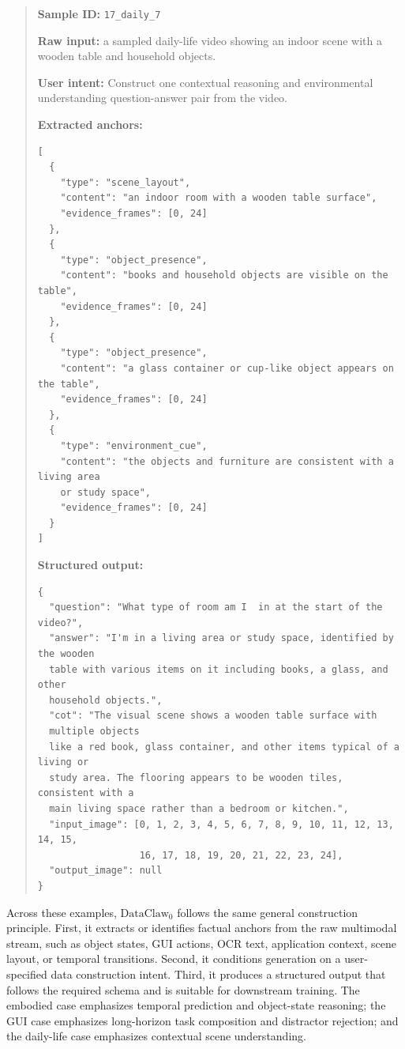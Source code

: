 \documentclass{llmxive}
\begin{document}
\begin{quote}
\small
\textbf{Sample ID:} \texttt{17\_daily\_7}

\textbf{Raw input:} a sampled daily-life video showing an indoor scene with a wooden table and household objects.

\textbf{User intent:} Construct one contextual reasoning and environmental understanding question-answer pair from the video.

\textbf{Extracted anchors:}
\begin{verbatim}
[
  {
    "type": "scene_layout",
    "content": "an indoor room with a wooden table surface",
    "evidence_frames": [0, 24]
  },
  {
    "type": "object_presence",
    "content": "books and household objects are visible on the table",
    "evidence_frames": [0, 24]
  },
  {
    "type": "object_presence",
    "content": "a glass container or cup-like object appears on the table",
    "evidence_frames": [0, 24]
  },
  {
    "type": "environment_cue",
    "content": "the objects and furniture are consistent with a living area 
    or study space",
    "evidence_frames": [0, 24]
  }
]
\end{verbatim}

\textbf{Structured output:}
\begin{verbatim}
{
  "question": "What type of room am I  in at the start of the video?",
  "answer": "I'm in a living area or study space, identified by the wooden
  table with various items on it including books, a glass, and other 
  household objects.",
  "cot": "The visual scene shows a wooden table surface with
  multiple objects
  like a red book, glass container, and other items typical of a living or
  study area. The flooring appears to be wooden tiles, consistent with a 
  main living space rather than a bedroom or kitchen.",
  "input_image": [0, 1, 2, 3, 4, 5, 6, 7, 8, 9, 10, 11, 12, 13, 14, 15,
                  16, 17, 18, 19, 20, 21, 22, 23, 24],
  "output_image": null
}
\end{verbatim}
\end{quote}


Across these examples, $\text{DataClaw}_0$ follows the same general construction principle. First, it extracts or identifies factual anchors from the raw multimodal stream, such as object states, GUI actions, OCR text, application context, scene layout, or temporal transitions. Second, it conditions generation on a user-specified data construction intent. Third, it produces a structured output that follows the required schema and is suitable for downstream training. The embodied case emphasizes temporal prediction and object-state reasoning; the GUI case emphasizes long-horizon task composition and distractor rejection; and the daily-life case emphasizes contextual scene understanding. 
\end{document}
